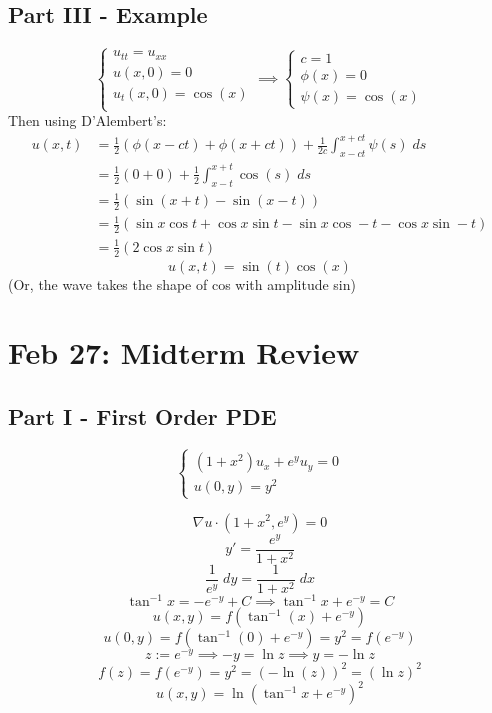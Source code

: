 \documentclass[12pt]{article}
\begin{document}
\subsection*{Part III  - Example}
\[\begin{cases}
    u_{tt} = u_{xx}\\
    u(x, 0) = 0\\
    u_t(x, 0) = \cos(x)\\
\end{cases} \implies \begin{cases}
    c = 1\\
    \phi(x) = 0\\
    \psi(x) = \cos (x)
\end{cases}\]
Then using D'Alembert's:
\begin{align*}
    u(x, t) &= \frac{1}{2}(\phi(x - ct) + \phi(x + ct)) + \frac{1}{2c}\int_{x - ct}^{x + ct} \psi(s)\;ds\\
    &= \frac{1}{2}(0 + 0) + \frac{1}{2} \int_{x - t}^{x +t}\cos(s)\; ds\\
    &= \frac{1}{2}(\sin(x + t) - \sin(x - t))\\
    &= \frac{1}{2}(\sin x \cos t + \cos x \sin t - \sin x \cos -t - \cos x \sin -t)\\
    &= \frac{1}{2}(2 \cos x \sin t)
\end{align*}
\[\boxed{u(x, t) = \sin(t) \cos(x)}\]
(Or, the wave takes the shape of cos with amplitude sin)

\section{Feb 27: Midterm Review}
\subsection*{Part I  - First Order PDE}
\[\begin{cases}
    (1 + x^2)u_x + e^y u_y = 0\\
    u(0 ,y) = y^2
\end{cases}\]

\[\nabla u \cdot (1 + x^2, e^y) = 0\]
\[y' = \frac{e^y}{1  +x^2}\]
\[\frac{1}{e^y}\; dy = \frac{1}{1 + x^2}\; dx\]
\[\tan^{-1} x = -e^{-y} + C \implies \tan^{-1}x + e^{-y} = C\]
\[u(x, y) = f(\tan^{-1}(x) + e^{-y})\]
\[u(0, y) = f(\tan^{-1}(0) + e^{-y}) = y^2 = f(e^{-y})\]
\[z := e^{-y} \implies -y = \ln z \implies y = - \ln z\]
\[f(z) = f(e^{-y}) = y^2 = (-\ln(z))^2 = (\ln z)^2\]
\[\boxed{u(x, y) = \ln(\tan^{-1} x + e^{-y})^2}\]
\end{document}
